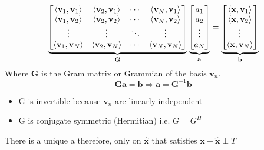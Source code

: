 \documentclass[12pt]{article}
\begin{document}
\begin{equation*}
    \underbrace{
        \begin{bmatrix}
            \langle \mathbf{v}_1,\mathbf{v}_1 \rangle & \langle \mathbf{v}_2,\mathbf{v}_1 \rangle & \cdots & \langle \mathbf{v}_N,\mathbf{v}_1 \rangle \\
            \langle \mathbf{v}_1,\mathbf{v}_2 \rangle & \langle \mathbf{v}_2,\mathbf{v}_2 \rangle & \cdots & \langle \mathbf{v}_N,\mathbf{v}_2 \rangle \\
            \vdots & \vdots & \ddots & \vdots \\
            \langle \mathbf{v}_1,\mathbf{v}_N \rangle & \langle \mathbf{v}_2,\mathbf{v}_N \rangle & \cdots & \langle \mathbf{v}_N,\mathbf{v}_N \rangle \\
        \end{bmatrix}    
    }_{\text{\textbf{G}}}
    \underbrace{
        \begin{bmatrix}
            a_1 \\ 
            a_2 \\ 
            \vdots \\
            a_N
        \end{bmatrix}
    }_{\text{\textbf{a}}}
    = 
    \underbrace{
        \begin{bmatrix}
            \langle \mathbf{x},\mathbf{v}_1 \rangle  \\ 
            \langle \mathbf{x},\mathbf{v}_2 \rangle  \\ 
            \vdots \\
            \langle \mathbf{x},\mathbf{v}_N \rangle 
        \end{bmatrix}
    }_{\text{\textbf{b}}}
\end{equation*}
Where \textbf{G} is the Gram matrix or Grammian of the basis ${\mathbf{v}_n}$.
\begin{equation*}
    \mathbf{G} \mathbf{a} = \mathbf{b} \Rightarrow \mathbf{a} = \mathbf{G}^{-1} \mathbf{b}
\end{equation*}
\begin{itemize}
    \item G is invertible because ${\mathbf{v}_n}$ are linearly independent \\
    \item G is conjugate symmetric (Hermitian) i.e. $G = G^H$ \\
\end{itemize}
There is a unique a therefore, only on $\hat{\mathbf{x}}$ that satisfies $\mathbf{x} - \hat{\mathbf{x}} \perp T$
\end{document}
